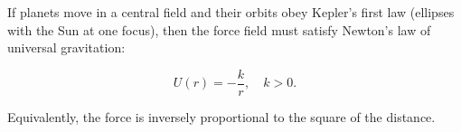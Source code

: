 If planets move in a central field and their orbits obey Kepler's first law (ellipses with the Sun at one focus), then the force field must satisfy Newton's law of universal gravitation:

$$U(r) = -\frac{k}{r}, \quad k > 0.$$

Equivalently, the force is inversely proportional to the square of the distance.
